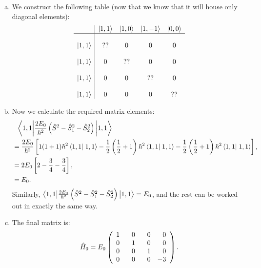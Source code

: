 \documentclass[12pt]{article}
\newcommand\half{\frac{1}{2}}
\newcommand\lr{\left \langle}
\newcommand\rr{\right \rangle}
\newcommand\ls{\left |}
\newcommand\rs{\right |}
\newcommand\hs{\hat{S}}
\begin{document}
\begin{enumerate}[1.]
\begin{enumerate}[a)]
    \item We construct the following table (now that we know that it will house only diagonal elements):
        $$
    \begin{array}{c|cccc}
    \hphantom{ \ls 1, 1 \rr} & \ls 1, 1 \rr & \ls 1, 0 \rr & \ls 1, -1 \rr & \ls 0, 0 \rr \\
    \hline \\
    \ls 1, 1 \rr & ?? & 0 & 0 & 0 \\
    \hphantom{ \ls 1, 1 \rr} \\
    \ls 1, 1 \rr & 0 & ?? & 0 & 0 \\
    \hphantom{ \ls 1, 1 \rr} \\
    \ls 1, 1 \rr & 0 & 0 & ?? & 0 \\
    \hphantom{ \ls 1, 1 \rr} \\
    \ls 1, 1 \rr & 0 & 0 & 0 & ?? \\
    \end{array}
        $$
    \item Now we calculate the required matrix elements:
    $$
    \begin{aligned}
    & \hphantom{=} { \lr 1, 1 \vphantom{\frac{2 E_0}{\hbar^2}} \rs} \frac{2 E_0}{\hbar^2} \left(\hs^2 - \hs_1^2 - \hs_2^2 \right) { \ls \vphantom{\frac{2 E_0}{\hbar^2}} 1, 1  \rr} \\
    & = \frac{2 E_0}{\hbar^2} \left[ 1(1+1) \hbar^2 \lr 1,1 \vphantom{.} \rs \left. 1,1 \rr - \half \left(\half+1\right) \hbar^2 \lr 1,1 \vphantom{.} \rs \left. 1,1 \rr - \half \left( \half+1\right) \hbar^2 \lr 1,1 \vphantom{.} \rs \left. 1,1 \rr \right], \\
    & = 2 E_0 \left [ 2 - \frac{3}{4} - \frac{3}{4} \right], \\
    & = E_0.
    \end{aligned}
    $$
    Similarly, ${ \lr 1, 1 \vphantom{\frac{2 E_0}{\hbar^2}} \rs} \frac{2 E_0}{\hbar^2} \left(\hs^2 - \hs_1^2 - \hs_2^2 \right) { \ls \vphantom{\frac{2 E_0}{\hbar^2}} 1, 1  \rr} = E_0$, and the rest can be worked out in exactly the same way.
    \item The final matrix is:
    $$ \hat{H}_0 = E_0 \left(\begin{array}{rrrr}
    1 & 0 & 0 & 0 \\
    0 & 1 & 0 & 0 \\
    0 & 0 & 1 & 0 \\
    0 & \hphantom{-}0 & \hphantom{-}0 & -3 \\
    \end{array}\right). $$

\end{enumerate}
\end{enumerate}
\end{document}
